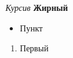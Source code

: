 \documentclass{article}
\begin{document}
\emph{Курсив} \textbf{Жирный}\begin{itemize}\item Пункт\end{itemize}\begin{enumerate}\item Первый\end{enumerate}
\end{document}
